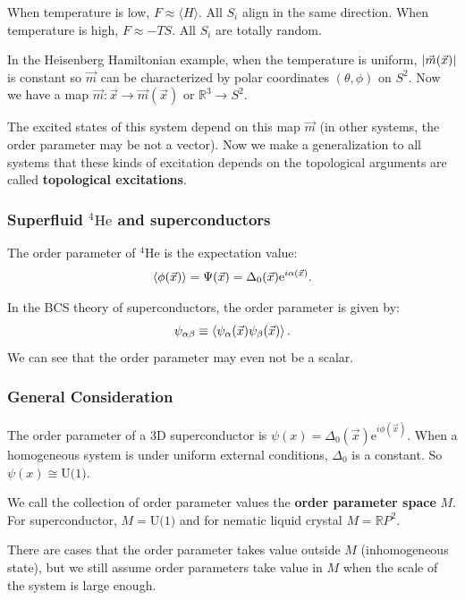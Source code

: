 \documentclass[10pt]{article}
\begin{document}
When temperature is low, $F\approx\langle H\rangle$.
All $S_i$ align in the same direction.
When temperature is high, $F\approx-TS$.
All $S_i$ are totally random.

In the Heisenberg Hamiltonian example, when the temperature is uniform, $\abs{\vec{m}(\vec{x})}$ is constant so $\vec{m}$ can be characterized by polar coordinates $(\theta,\phi)$ on $S^2$.
Now we have a map $\vec{m}: \vec{x}\to\vec{m}(\vec{x})$ or $\mathbb{R}^3\rightarrow S^2$.

The excited states of this system depend on this map $\vec{m}$ (in other systems, the order parameter may be not a vector).
Now we make a generalization to all systems that these kinds of excitation depends on the topological arguments are called \textbf{topological excitations}.

\subsubsection{Superfluid \texorpdfstring{{}$^4\text{He}$}{} and superconductors}
The order parameter of  $^4\text{He}$ is the expectation value:
\begin{align}
    \expval{\phi(\vec{x})}=\Psi(\vec{x})=\Delta_0 (\vec{x})\mathrm{e}^{i\alpha(\vec{x})}.
\end{align}

In the BCS theory of superconductors, the order parameter is given by:
\begin{align}
    \psi_{\alpha\beta}\equiv\expval{\psi_\alpha(\vec{x})\psi_\beta(\vec{x})}.
\end{align}
We can see that the order parameter may even not be a scalar.

\subsubsection{General Consideration}
The order parameter of a 3D superconductor is $\psi(x)=\Delta_0(\vec{x})\text{e}^{i\phi(\vec{x})}$.
When a homogeneous system is under uniform external conditions, $\Delta_0$ is a constant.
So $\psi(x)\cong\text{U(1)}$.

We call the collection of order parameter values the \textbf{order parameter space} $M$.
For superconductor, $M=\text{U(1)}$ and for nematic liquid crystal $M=\mathbb{R}P^2$.

There are cases that the order parameter takes value outside $M$ (inhomogeneous state), but we still assume order parameters take value in $M$ when the scale of the system is large enough.
\end{document}

